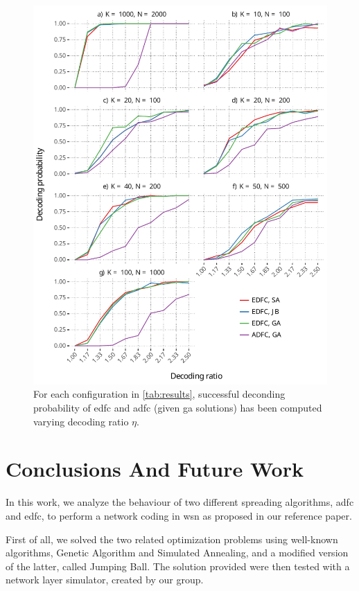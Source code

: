 \documentclass[12pt,journal,draftclsnofoot,onecolumn]{IEEEtran}
\begin{document}
\begin{figure}[htp]
	\includegraphics[]{figures/eta_vs_prob_reliable_ones.pdf}
	\caption{For each configuration in \autoref{tab:results}, successful deconding probability of \gls{edfc} and \gls{adfc} (given \gls{ga} solutions) has been computed varying decoding ratio $\eta$.}
	\label{fig:eta_vs_prob_reliable_ones}
\end{figure}

\clearpage
\section{Conclusions And Future Work}\label{sec:conclusions}
In this work, we analyze the behaviour of two different spreading algorithms, \gls{adfc} and \gls{edfc}, to perform a network coding in \gls{wsn} as proposed in our reference paper.\cite{Lin2007}

First of all, we solved the two related optimization problems using well-known algorithms, Genetic Algorithm and Simulated Annealing, and a modified version of the latter, called Jumping Ball. The solution provided were then tested with a network layer simulator, created by our group.
\end{document}
